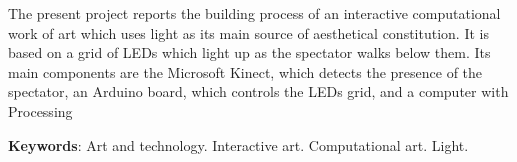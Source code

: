 
\begin{ABSTRACT}
	\begin{SingleSpace}
	
		\hspace{-1.3 cm}
		The present project reports the building process of an interactive computational work of art which uses light as its main source of aesthetical constitution. It is based on a grid of LEDs which light up as the spectator walks below them. Its main components are the Microsoft Kinect, which detects the presence of the spectator, an Arduino board, which controls the LEDs grid, and a computer with Processing

		\vspace*{0.5cm}\hspace{-1.3 cm}\textbf{Keywords}: Art and technology. Interactive art. Computational art. Light.
		
		
	\end{SingleSpace}

\end{ABSTRACT}
